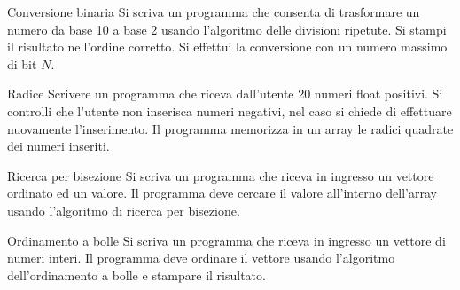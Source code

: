 \documentclass[format=169, handout]{beamer}
\begin{document}
\begin{frame}{Conversione binaria}
Si scriva un programma che consenta di trasformare un numero da base 10 a base 2 usando l'algoritmo delle divisioni ripetute. Si stampi il risultato nell'ordine corretto. Si effettui la conversione con un numero massimo di bit $N$.
\end{frame}

\begin{frame}{Radice}
Scrivere un programma che riceva dall'utente 20 numeri float positivi.
Si controlli che l'utente non inserisca numeri negativi, nel caso si chiede di effettuare nuovamente l'inserimento.
Il programma memorizza in un array le radici quadrate dei numeri inseriti.
\end{frame}

\begin{frame}{Ricerca per bisezione}
Si scriva un programma che riceva in ingresso un vettore ordinato ed un valore.
Il programma deve cercare il valore all'interno dell'array usando l'algoritmo di ricerca per bisezione.
\end{frame}

\begin{frame}{Ordinamento a bolle}
Si scriva un programma che riceva in ingresso un vettore di numeri interi.
Il programma deve ordinare il vettore usando l'algoritmo dell'ordinamento a bolle e stampare il risultato.
\end{frame}
\end{document}
